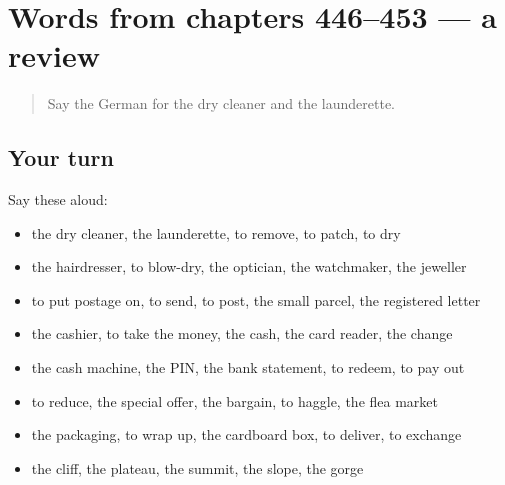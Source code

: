 \section[(dialogue)]{Words from chapters 446–453 — a review}

\label{lesson:GE-R453-review-446-453}



\begin{quote}
Say the German for the dry cleaner and the launderette.
\end{quote}

\subsection*{Your turn}
Say these aloud:

\begin{itemize}
\raggedright
  \item the dry cleaner, the launderette, to remove, to patch, to dry
  \item the hairdresser, to blow-dry, the optician, the watchmaker, the jeweller
  \item to put postage on, to send, to post, the small parcel, the registered letter
  \item the cashier, to take the money, the cash, the card reader, the change
  \item the cash machine, the PIN, the bank statement, to redeem, to pay out
  \item to reduce, the special offer, the bargain, to haggle, the flea market
  \item the packaging, to wrap up, the cardboard box, to deliver, to exchange
  \item the cliff, the plateau, the summit, the slope, the gorge
\end{itemize}

